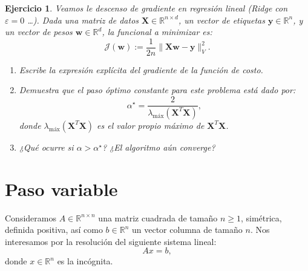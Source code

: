 \documentclass[11pt]{report}
\newtheorem{ex}{Ejercicio}
\newcommand{\R}{\mathbb{R}}
\begin{document}
\begin{ex}
Veamos le descenso de gradiente en regresión lineal (Ridge con $\varepsilon = 0$ \dots). 
Dada una matriz de datos $ \mathbf{X} \in \mathbb{R}^{n \times d} $, un vector de etiquetas $ \mathbf{y} \in \mathbb{R}^n $, y un vector de pesos $ \mathbf{w} \in \mathbb{R}^d $, la funcional a minimizar es:
$$
\mathcal{J}(\mathbf{w}) := \frac{1}{2n} \| \mathbf{X}\mathbf{w} - \mathbf{y}\|_V^2. 
$$

\begin{enumerate}
    \item Escribe la expresión explícita del gradiente de la función de costo.
    \item Demuestra que el paso óptimo constante para este problema está dado por:
   \[
   \alpha^\star = \frac{2}{\lambda_{\text{máx}}(\mathbf{X}^T \mathbf{X})},
   \]
   donde $\lambda_{\text{máx}}(\mathbf{X}^T \mathbf{X})$ es el valor propio máximo de $\mathbf{X}^T \mathbf{X}$.
\item ¿Qué ocurre si $\alpha > \alpha^\star$? ¿El algoritmo aún converge?
\end{enumerate}
\end{ex}




\section{Paso variable}

Consideramos $A \in \R^{n \times n}$ una matriz cuadrada de tamaño $n \geq 1$, simétrica, definida positiva, así como $b \in \R^n$ un vector columna de tamaño $n$. Nos interesamos por la resolución del siguiente sistema lineal:
\begin{equation}
A x = b,
\label{eq:systlin}
\end{equation}
donde $x \in \R^n$ es la incógnita.
\end{document}
